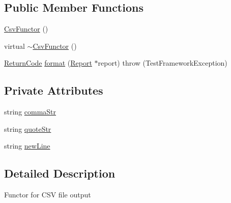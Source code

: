 \subsection*{Public Member Functions}
\begin{DoxyCompactItemize}
\item 
\hyperlink{classit_1_1testbench_1_1formatter_1_1CsvFunctor_aeb232c30bf207bd0d5a81bb84eac1ef9}{Csv\-Functor} ()
\item 
virtual \hyperlink{classit_1_1testbench_1_1formatter_1_1CsvFunctor_a4aa58258e7d0ca3a69a2673628f78655}{$\sim$\-Csv\-Functor} ()
\item 
\hyperlink{structit_1_1testbench_1_1data_1_1ReturnCode}{Return\-Code} \hyperlink{classit_1_1testbench_1_1formatter_1_1CsvFunctor_a9036afde43ce2038a0a19bfcb96e89f5}{format} (\hyperlink{classit_1_1testbench_1_1data_1_1Report}{Report} $\ast$report)  throw (\-Test\-Framework\-Exception)
\end{DoxyCompactItemize}
\subsection*{Private Attributes}
\begin{DoxyCompactItemize}
\item 
string \hyperlink{classit_1_1testbench_1_1formatter_1_1CsvFunctor_a8e156444be39e0d435e9d7c69dea055a}{comma\-Str}
\item 
string \hyperlink{classit_1_1testbench_1_1formatter_1_1CsvFunctor_af963baf38dee72fb672f7a23899af0be}{quote\-Str}
\item 
string \hyperlink{classit_1_1testbench_1_1formatter_1_1CsvFunctor_adfaa850658fda83deaf3d2c0040ce0ac}{new\-Line}
\end{DoxyCompactItemize}


\subsection{Detailed Description}
Functor for C\-S\-V file output 

